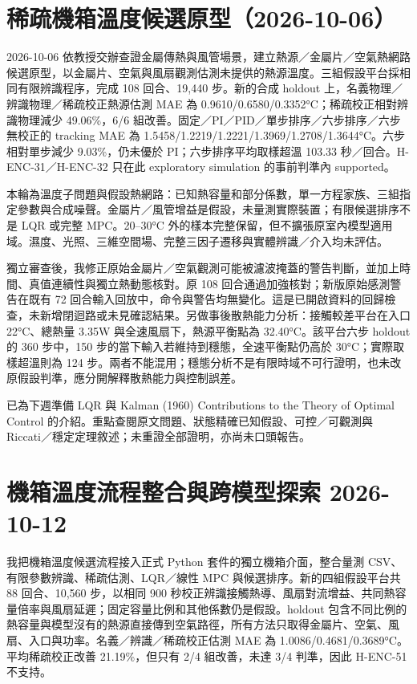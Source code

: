 \documentclass[12pt,a4paper]{article}
\begin{document}
\section*{稀疏機箱溫度候選原型（2026-10-06）}

2026-10-06 依教授交辦查證金屬傳熱與風管場景，建立熱源／金屬片／空氣熱網路候選原型，以金屬片、空氣與風扇觀測估測未提供的熱源溫度。三組假設平台採相同有限辨識程序，完成 108 回合、19,440 步。新的合成 holdout 上，名義物理／辨識物理／稀疏校正熱源估測 MAE 為 0.9610/0.6580/0.3352°C；稀疏校正相對辨識物理減少 49.06\%，6/6 組改善。固定／PI／PID／單步排序／六步排序／六步無校正的 tracking MAE 為 1.5458/1.2219/1.2221/1.3969/1.2708/1.3644°C。六步相對單步減少 9.03\%，仍未優於 PI；六步排序平均取樣超溫 103.33 秒／回合。H-ENC-31／H-ENC-32 只在此 exploratory simulation 的事前判準內 supported。


本輪為溫度子問題與假設熱網路：已知熱容量和部分係數，單一方程家族、三組指定參數與合成噪聲。金屬片／風管增益是假設，未量測實際裝置；有限候選排序不是 LQR 或完整 MPC。20–30°C 外的樣本完整保留，但不擴張原室內模型適用域。濕度、光照、三維空間場、完整三因子遷移與實體辨識／介入均未評估。


獨立審查後，我修正原始金屬片／空氣觀測可能被濾波掩蓋的警告判斷，並加上時間、真值連續性與獨立熱動態核對。原 108 回合通過加強核對；新版原始感測警告在既有 72 回合輸入回放中，命令與警告均無變化。這是已開啟資料的回歸檢查，未新增閉迴路或未見確認結果。另做事後散熱能力分析：接觸較差平台在入口 22°C、總熱量 3.35W 與全速風扇下，熱源平衡點為 32.40°C。該平台六步 holdout 的 360 步中，150 步的當下輸入若維持到穩態，全速平衡點仍高於 30°C；實際取樣超溫則為 124 步。兩者不能混用；穩態分析不是有限時域不可行證明，也未改原假設判準，應分開解釋散熱能力與控制誤差。


已為下週準備 LQR 與 Kalman (1960) Contributions to the Theory of Optimal Control 的介紹。重點查閱原文問題、狀態精確已知假設、可控／可觀測與 Riccati／穩定定理敘述；未重證全部證明，亦尚未口頭報告。


\section*{機箱溫度流程整合與跨模型探索 2026-10-12}

我把機箱溫度候選流程接入正式 Python 套件的獨立機箱介面，整合量測 CSV、有限參數辨識、稀疏估測、LQR／線性 MPC 與候選排序。新的四組假設平台共 88 回合、10,560 步，以相同 900 秒校正辨識接觸熱導、風扇對流增益、共同熱容量倍率與風扇延遲；固定容量比例和其他係數仍是假設。holdout 包含不同比例的熱容量與模型沒有的熱源直接傳到空氣路徑，所有方法只取得金屬片、空氣、風扇、入口與功率。名義／辨識／稀疏校正估測 MAE 為 1.0086/0.4681/0.3689°C。平均稀疏校正改善 21.19\%，但只有 2/4 組改善，未達 3/4 判準，因此 H-ENC-51 不支持。
\end{document}
